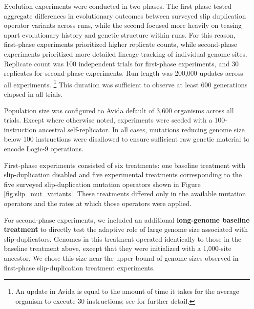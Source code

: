 Evolution experiments were conducted in two phases.
The first phase tested aggregate differences in evolutionary outcomes between surveyed slip duplication operator variants across runs, while the second focused more heavily on teasing apart evolutionary history and genetic structure within runs.
For this reason, first-phase experiments prioritized higher replicate counts, while second-phase experiments prioritized more detailed lineage tracking of individual genome sites.
Replicate count was 100 independent trials for first-phase experiments, and 30 replicates for second-phase experiments.
Run length was 200,000 updates across all experiments.
\footnote{An update in Avida is equal to the amount of time it takes for the average organism to execute 30 instructions; see \citep{Ofria:2009avida} for further detail.}
This duration was sufficient to observe at least 600 generations elapsed in all trials.

Population size was configured to Avida default of 3,600 organisms across all trials.
Except where otherwise noted, experiments were seeded with a 100-instruction ancestral self-replicator.
In all cases, mutations reducing genome size below 100 instructions were disallowed to ensure sufficient raw genetic material to encode Logic-9 operations.

% 

First-phase experiments consisted of six treatments: one baseline treatment with slip-duplication disabled and five experimental treatments corresponding to the five surveyed slip-duplication mutation operators shown in Figure \ref{fig:slip_mut_variants}.
These treatments differed only in the available mutation operators and the rates at which those operators were applied.


For second-phase experiments, we included an additional \textbf{long-genome baseline treatment} to directly test the adaptive role of large genome size associated with slip-duplicators.
Genomes in this treatment operated identically to those in the baseline treatment above, except that they were initialized with a 1,000-site ancestor.
We chose this size near the upper bound of genome sizes observed in first-phase slip-duplication treatment experiments.

